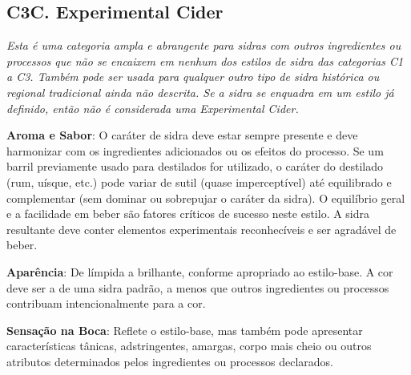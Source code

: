 \subsection*{C3C. Experimental Cider}

\textit{Esta é uma categoria ampla e abrangente para sidras com outros ingredientes ou processos que não se encaixem em nenhum dos estilos de sidra das categorias C1 a C3. Também pode ser usada para qualquer outro tipo de sidra histórica ou regional tradicional ainda não descrita. Se a sidra se enquadra em um estilo já definido, então não é considerada uma Experimental Cider.}

\textbf{Aroma e Sabor}: O caráter de sidra deve estar sempre presente e deve harmonizar com os ingredientes adicionados ou os efeitos do processo. Se um barril previamente usado para destilados for utilizado, o caráter do destilado (rum, uísque, etc.) pode variar de sutil (quase imperceptível) até equilibrado e complementar (sem dominar ou sobrepujar o caráter da sidra). O equilíbrio geral e a facilidade em beber são fatores críticos de sucesso neste estilo. A sidra resultante deve conter elementos experimentais reconhecíveis e ser agradável de beber.

\textbf{Aparência}: De límpida a brilhante, conforme apropriado ao estilo-base. A cor deve ser a de uma sidra padrão, a menos que outros ingredientes ou processos contribuam intencionalmente para a cor.

\textbf{Sensação na Boca}: Reflete o estilo-base, mas também pode apresentar características tânicas, adstringentes, amargas, corpo mais cheio ou outros atributos determinados pelos ingredientes ou processos declarados.

